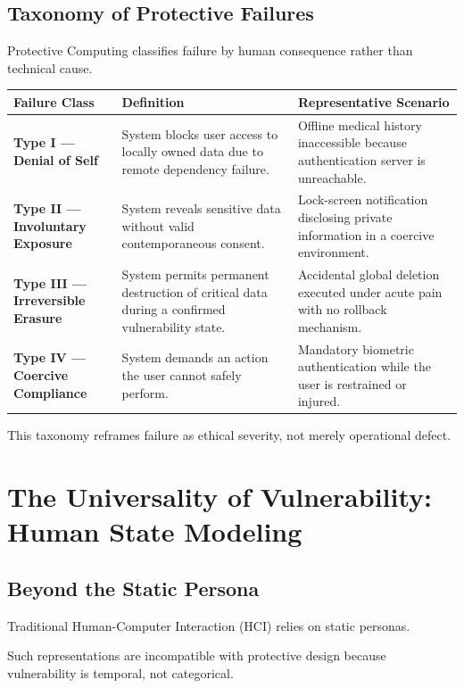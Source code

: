 \documentclass[12pt]{article}
\begin{document}
\subsection{Taxonomy of Protective Failures}
Protective Computing classifies failure by human consequence rather than technical cause.

\begin{center}
\begin{tabular}{@{}p{2.5cm}p{4cm}p{5cm}@{}}
\toprule
Failure Class & Definition & Representative Scenario \\
\midrule
\textbf{Type I --- Denial of Self} & System blocks user access to locally owned data due to remote dependency failure. & Offline medical history inaccessible because authentication server is unreachable. \\
\midrule
\textbf{Type II --- Involuntary Exposure} & System reveals sensitive data without valid contemporaneous consent. & Lock-screen notification disclosing private information in a coercive environment. \\
\midrule
\textbf{Type III --- Irreversible Erasure} & System permits permanent destruction of critical data during a confirmed vulnerability state. & Accidental global deletion executed under acute pain with no rollback mechanism. \\
\midrule
\textbf{Type IV --- Coercive Compliance} & System demands an action the user cannot safely perform. & Mandatory biometric authentication while the user is restrained or injured. \\
\bottomrule
\end{tabular}
\end{center}

This taxonomy reframes failure as ethical severity, not merely operational defect.

\section{The Universality of Vulnerability: Human State Modeling}

\subsection{Beyond the Static Persona}
Traditional Human-Computer Interaction (HCI) relies on static personas.

Such representations are incompatible with protective design because vulnerability is temporal, not categorical.
\end{document}
